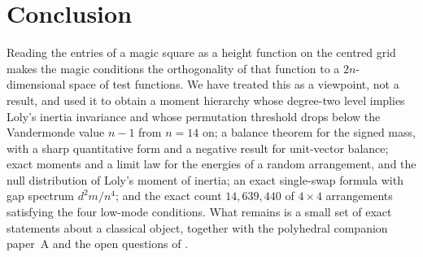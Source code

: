 \section{Conclusion}
\label{sec:conclusion}

Reading the entries of a magic square as a height function on the centred grid makes the magic conditions the orthogonality of that function to a $2n$-dimensional space of test functions.
We have treated this as a viewpoint, not a result, and used it to obtain a moment hierarchy whose degree-two level implies Loly's inertia invariance and whose permutation threshold drops below the Vandermonde value $n-1$ from $n=14$ on; a balance theorem for the signed mass, with a sharp quantitative form and a negative result for unit-vector balance; exact moments and a limit law for the energies of a random arrangement, and the null distribution of Loly's moment of inertia; an exact single-swap formula with gap spectrum $d^2m/n^4$; and the exact count $14{,}639{,}440$ of $4\times4$ arrangements satisfying the four low-mode conditions.
What remains is a small set of exact statements about a classical object, together with the polyhedral companion paper~A \cite{mathewson_gems} and the open questions of .
